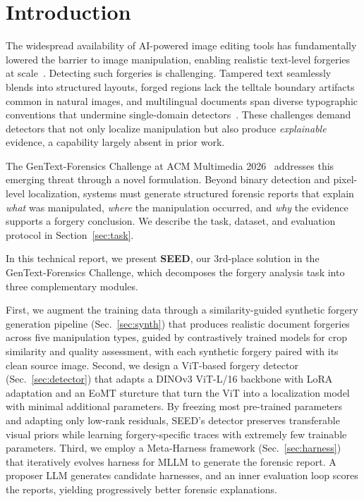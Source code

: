 \documentclass[sigconf, screen, review, anonymous]{acmart}
\begin{document}

\maketitle

\section{Introduction}

The widespread availability of AI-powered image editing tools has fundamentally lowered the barrier to image manipulation, enabling realistic text-level forgeries at scale~\cite{wong2025fontguard,wong2025end,wong2026k}. Detecting such forgeries is challenging. Tampered text seamlessly blends into structured layouts, forged regions lack the telltale boundary artifacts common in natural images, and multilingual documents span diverse typographic conventions that undermine single-domain detectors~\cite{qu2023towards,wong2025adcd}. These challenges demand detectors that not only localize manipulation but also produce \emph{explainable} evidence, a capability largely absent in prior work.

The GenText-Forensics Challenge at ACM Multimedia 2026~\cite{gentext2026} addresses this emerging threat through a novel formulation. Beyond binary detection and pixel-level localization, systems must generate structured forensic reports that explain \emph{what} was manipulated, \emph{where} the manipulation occurred, and \emph{why} the evidence supports a forgery conclusion. We describe the task, dataset, and evaluation protocol in Section~\ref{sec:task}.

In this technical report, we present \textbf{SEED}, our 3rd-place solution in the GenText-Forensics Challenge, which decomposes the forgery analysis task into three complementary modules. 

First, we augment the training data through a similarity-guided synthetic forgery generation pipeline (Sec.~\ref{sec:synth}) that produces realistic document forgeries across five manipulation types, guided by contrastively trained models for crop similarity and quality assessment, with each synthetic forgery paired with its clean source image. Second, we design a ViT-based forgery detector (Sec.~\ref{sec:detector}) that adapts a DINOv3 ViT-L/16 \cite{simeoni2025dinov3} backbone with LoRA adaptation \cite{hu2021lora} and an EoMT \cite{kerssies2025your} sturcture \cite{cheng2022masked} that turn the ViT into a localization model with minimal additional parameters. By freezing most pre-trained parameters and adapting only low-rank residuals, SEED's detector preserves transferable visual priors while learning forgery-specific traces with extremely few trainable parameters. Third, we employ a Meta-Harness framework (Sec.~\ref{sec:harness}) that iteratively evolves harness for MLLM to generate the forensic report. A proposer LLM generates candidate harnesses, and an inner evaluation loop scores the reports, yielding progressively better forensic explanations.
\end{document}
